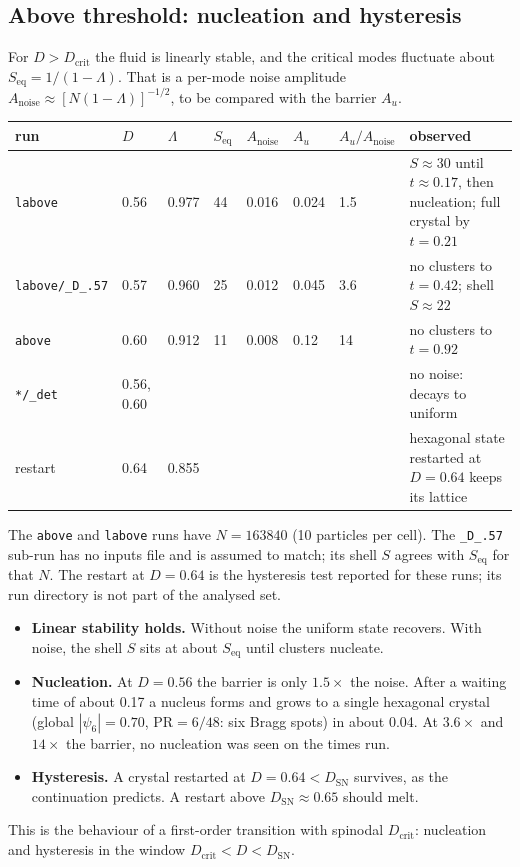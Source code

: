\documentclass[11pt]{article}
\newcommand{\code}[1]{\texttt{#1}}
\newcommand{\Dc}{D_{\mathrm{crit}}}
\newcommand{\Dsn}{D_{\mathrm{SN}}}
\begin{document}
\subsection{Above threshold: nucleation and hysteresis}
For $D>\Dc$ the fluid is linearly stable, and the critical modes fluctuate
about $S_{\mathrm{eq}}=1/(1-\Lambda)$. That is a per-mode noise amplitude
$A_{\mathrm{noise}}\approx[N(1-\Lambda)]^{-1/2}$, to be compared with the
barrier $A_u$.
\begin{center}
\begin{tabularx}{\textwidth}{@{}lllllllL@{}}
\toprule
run & $D$ & $\Lambda$ & $S_{\mathrm{eq}}$ & $A_{\mathrm{noise}}$ & $A_u$ & $A_u/A_{\mathrm{noise}}$ & observed \\
\midrule
\code{labove} & 0.56 & 0.977 & 44 & 0.016 & 0.024 & 1.5 & $S\approx30$ until $t\approx0.17$, then nucleation; full crystal by $t=0.21$ \\
\code{labove/\_D\_.57} & 0.57 & 0.960 & 25 & 0.012 & 0.045 & 3.6 & no clusters to $t=0.42$; shell $S\approx22$ \\
\code{above} & 0.60 & 0.912 & 11 & 0.008 & 0.12 & 14 & no clusters to $t=0.92$ \\
\code{*/\_det} & 0.56, 0.60 & & & & & & no noise: decays to uniform \\
restart & 0.64 & 0.855 & & & & & hexagonal state restarted at $D=0.64$ keeps its lattice \\
\bottomrule
\end{tabularx}
\end{center}
The \code{above} and \code{labove} runs have $N=163840$ (10 particles per
cell). The \code{\_D\_.57} sub-run has no inputs file and is assumed to match;
its shell $S$ agrees with $S_{\mathrm{eq}}$ for that $N$. The restart at
$D=0.64$ is the hysteresis test reported for these runs; its run directory is
not part of the analysed set.
\begin{itemize}
  \item \textbf{Linear stability holds.} Without noise the uniform state
        recovers. With noise, the shell $S$ sits at about $S_{\mathrm{eq}}$
        until clusters nucleate.
  \item \textbf{Nucleation.} At $D=0.56$ the barrier is only $1.5\times$ the
        noise. After a waiting time of about 0.17 a nucleus forms and grows to
        a single hexagonal crystal (global $|\psi_6|=0.70$, $\mathrm{PR}=6/48$:
        six Bragg spots) in about 0.04. At $3.6\times$ and $14\times$ the
        barrier, no nucleation was seen on the times run.
  \item \textbf{Hysteresis.} A crystal restarted at $D=0.64<\Dsn$ survives,
        as the continuation predicts. A restart above $\Dsn\approx0.65$ should
        melt.
\end{itemize}
This is the behaviour of a first-order transition with spinodal $\Dc$:
nucleation and hysteresis in the window $\Dc<D<\Dsn$.
\end{document}
